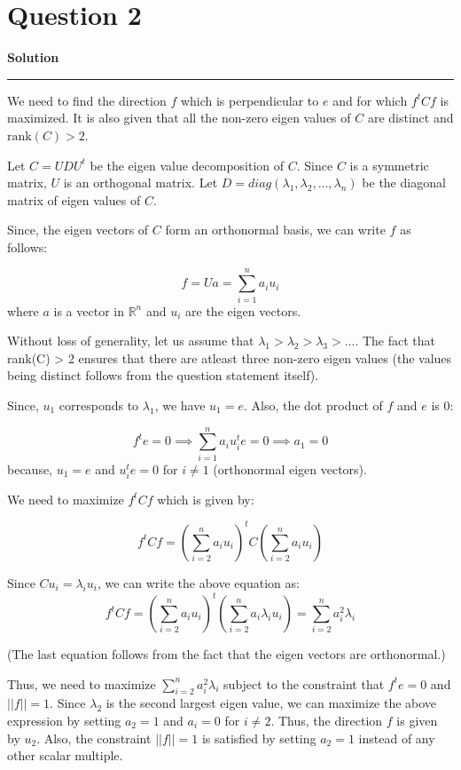 \documentclass[a4paper,12pt]{article}
\title{\cooltitle{CS663 Assignment-4}}
\author{{\bf Saksham Rathi, Kavya Gupta, Shravan Srinivasa Raghavan} \\
\small Department of Computer Science, \\
Indian Institute of Technology Bombay \\}
\date{}
\newenvironment{solution}[2][]{%
    \begin{mdframed}[linecolor=blue!70!black, linewidth=2pt, roundcorner=10pt, backgroundcolor=yellow!10!white, skipabove=12pt, skipbelow=12pt]%
        \textbf{\large #2}
        \par\noindent\rule{\textwidth}{0.4pt}
}{
    \end{mdframed}
}
\begin{document}
\maketitle

\section*{Question 2}

\begin{solution}{Solution}
We need to find the direction $f$ which is perpendicular to $e$ and for which $f^tCf$ is maximized. It is also given that all the non-zero eigen values of $C$ are distinct and $\text{rank}(C) > 2$. 

Let $C = UDU^t$ be the eigen value decomposition of $C$. Since $C$ is a symmetric matrix, $U$ is an orthogonal matrix. Let $D = diag(\lambda_1, \lambda_2, \ldots, \lambda_n)$ be the diagonal matrix of eigen values of $C$.


Since, the eigen vectors of $C$ form an orthonormal basis, we can write $f$ as follows:

\begin{equation}
    f = Ua = \sum_{i=1}^{n} a_iu_i
\end{equation}
where $a$ is a vector in $\mathbb{R}^n$ and $u_i$ are the eigen vectors.

Without loss of generality, let us assume that $\lambda_1 > \lambda_2 > \lambda_3 > \dots$. The fact that rank(C) > 2 ensures that there are atleast three non-zero eigen values (the values being distinct follows from the question statement itself).

Since, $u_1$ corresponds to $\lambda_1$, we have $u_1 = e$. Also, the dot product of $f$ and $e$ is 0:

\begin{equation}
  f^te = 0 \implies \sum_{i=1}^{n} a_iu_i^te = 0 \implies a_1 = 0
\end{equation}
because, $u_1 = e$ and $u_i^te = 0$ for $i \neq 1$ (orthonormal eigen vectors).

We need to maximize $f^tCf$ which is given by:

\begin{equation}
  f^tCf = (\sum_{i=2}^n a_iu_i)^t C(\sum_{i=2}^n a_iu_i)
\end{equation}

Since $Cu_i = \lambda_i u_i$, we can write the above equation as:
\begin{equation}
  f^tCf = (\sum_{i=2}^n a_iu_i)^t (\sum_{i=2}^n a_i\lambda_iu_i) = \sum_{i=2}^n a_i^2\lambda_i
\end{equation}

(The last equation follows from the fact that the eigen vectors are orthonormal.)

Thus, we need to maximize $\sum_{i=2}^n a_i^2\lambda_i$ subject to the constraint that $f^te = 0$ and $||f|| = 1$. Since $\lambda_2$ is the second largest eigen value, we can maximize the above expression by setting $a_2 = 1$ and $a_i = 0$ for $i \neq 2$. Thus, the direction $f$ is given by $u_2$. Also, the constraint $||f|| = 1$ is satisfied by setting $a_2 = 1$ instead of any other scalar multiple.
\end{solution}
\end{document}
